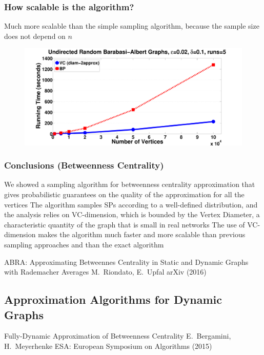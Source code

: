 \begin{frame}
  \frametitle{How scalable is the algorithm?}
  Much more scalable than the simple sampling algorithm, because the sample
  size does not depend on $n$
  \vfill
  \begin{figure}[H]
    \centering
    \includegraphics[scale=0.22]{imgs/random-time.pdf}
  \end{figure}
\end{frame}

\begin{frame}
  \frametitle{Conclusions (Betweenness Centrality)}
  \vfill
  We showed a sampling algorithm for betweenness centrality approximation that
  gives probabilistic guarantees on the quality of the approximation for all
  the vertices
  \vfill
  The algorithm samples SPs according to a well-defined distribution, and
  the analysis relies on VC-dimension, which is bounded by the Vertex Diameter,
  a characteristic quantity of the graph that is small in real networks
  \vfill
  The use of VC-dimension makes the algorithm much faster and more scalable
  than previous sampling approaches and than the exact algorithm
\end{frame}

\begin{frame}
  \centering
  \vfill
  {\huge ABRA: Approximating Betweennes Centrality in Static and Dynamic
  Graphs with Rademacher Averages}
  \vfill
  {\large M.~Riondato, E.~Upfal}
  \vfill
  {\large arXiv (2016)}
  \vfill
\end{frame}

\subsection{Approximation Algorithms for Dynamic Graphs}

\begin{frame}
  \centering
  \vfill
  {\huge Fully-Dynamic Approximation of Betweenness Centrality}
  \vfill
  {\Large E.~Bergamini, H.~Meyerhenke}
  \vfill
  {\large ESA: European Symposium on Algorithms (2015)}
  \vfill
\end{frame}

